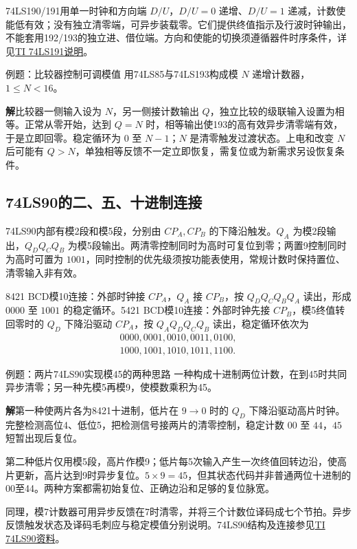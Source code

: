 \documentclass[UTF8,fontset=none,zihao=-4,a4paper]{ctexart}
\newcommand{\sol}{\par\noindent\textbf{解}\quad}
\begin{document}
74LS190/191用单一时钟和方向端 $D/U$，$D/U=0$ 递增、$D/U=1$ 递减，计数使能低有效；没有独立清零端，可异步装载零。它们提供终值指示及行波时钟输出，不能套用192/193的独立进、借位端。方向和使能的切换须遵循器件时序条件，详见\href{https://www.ti.com/product/SN74LS191}{TI 74LS191说明}。

\begin{infobox}{例题：比较器控制可调模值}
用74LS85与74LS193构成模 $N$ 递增计数器，$1\le N<16$。
\end{infobox}
\sol 比较器一侧输入设为 $N$，另一侧接计数输出 $Q$，独立比较的级联输入设置为相等。正常从零开始，达到 $Q=N$ 时，相等输出使193的高有效异步清零端有效，于是立即回零。稳定循环为 $0$ 至 $N-1$；$N$ 是清零触发过渡状态。上电和改变 $N$ 后可能有 $Q>N$，单独相等反馈不一定立即恢复，需复位或为新需求另设恢复条件。

\subsection{74LS90的二、五、十进制连接}
74LS90内部有模2段和模5段，分别由 $CP_A,CP_B$ 的下降沿触发。$Q_A$ 为模2段输出，$Q_DQ_CQ_B$ 为模5段输出。两清零控制同时为高时可复位到零；两置9控制同时为高时可置为 $1001$，同时控制的优先级须按功能表使用，常规计数时保持置位、清零输入非有效。

8421 BCD模10连接：外部时钟接 $CP_A$，$Q_A$ 接 $CP_B$，按 $Q_DQ_CQ_BQ_A$ 读出，形成 $0000$ 至 $1001$ 的稳定循环。5421 BCD模10连接：外部时钟先接 $CP_B$，模5终值转回零时的 $Q_D$ 下降沿驱动 $CP_A$，按 $Q_AQ_DQ_CQ_B$ 读出，稳定循环依次为
\[
\begin{gathered}
0000,0001,0010,0011,0100,\\
1000,1001,1010,1011,1100.
\end{gathered}
\]

\begin{infobox}{例题：两片74LS90实现模45的两种思路}
一种构成十进制两位计数，在到45时共同异步清零；另一种先模5再模9，使模数乘积为45。
\end{infobox}
\sol 第一种使两片各为8421十进制，低片在 $9\to0$ 时的 $Q_D$ 下降沿驱动高片时钟。完整检测高位4、低位5，把检测信号接两片的清零控制，稳定计数 $00$ 至 $44$，$45$ 短暂出现后复位。

第二种低片仅用模5段，高片作模9；低片每5次输入产生一次终值回转边沿，使高片更新，高片达到9时异步复位。$5\times9=45$，但其状态代码并非普通两位十进制的00至44。两种方案都需初始复位、正确边沿和足够的复位脉宽。

同理，模7计数器可用异步反馈在7时清零，并将三个计数位译码成七个节拍。异步反馈触发状态及译码毛刺应与稳定模值分别说明。74LS90结构及连接参见\href{https://www.ti.com/product/SN74LS90}{TI 74LS90资料}。
\end{document}
